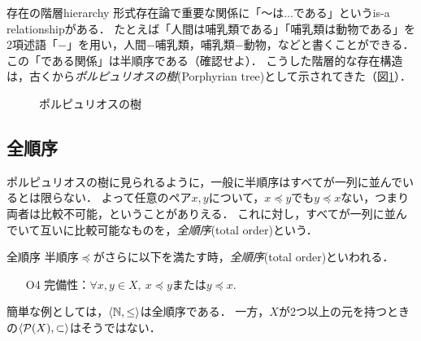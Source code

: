 \documentclass[dvipdfmx,11pt,a4paper]{jsarticle}
\begin{document}
\begin{rei}{存在の階層}{hierarchy}
形式存在論で重要な関係に「〜は...である」というis-a relationshipがある．
たとえば「人間は哺乳類である」「哺乳類は動物である」を2項述語「$-$」を用い，人間$-$哺乳類，哺乳類$-$動物，などと書くことができる．
この「である関係」は半順序である（確認せよ）．
こうした階層的な存在構造は，古くから\emph{ポルピュリオスの樹}(Porphyrian tree)として示されてきた（図\ref{fig:porphyrian}）．
\end{rei}
\begin{figure}[h]
\centering
{}
\caption{ポルピュリオスの樹}
\label{fig:porphyrian} 
\end{figure}






\subsection{全順序}
ポルピュリオスの樹に見られるように，一般に半順序はすべてが一列に並んでいるとは限らない．
よって任意のペア$x, y$について，$x \preceq y $でも$y \preceq x$ない，つまり両者は比較不可能，ということがありえる．
これに対し，すべてが一列に並んでいて互いに比較可能なものを，\emph{全順序}(total order)という．


\begin{dfn}{全順序}{}
半順序$\preceq$がさらに以下を満たす時，\emph{全順序}(total order)といわれる．
\begin{itemize}
 \item[O4] 完備性：$\forall x, y \in X, \ x \preceq y$または$y \preceq x$. 
\end{itemize}
\end{dfn}
%
簡単な例としては，$\langle \mathbb{N}, \leq \rangle$は全順序である．
一方，$X$が2つ以上の元を持つときの$\langle \mathcal{P}(X), \subset \rangle$はそうではない．
\end{document}
